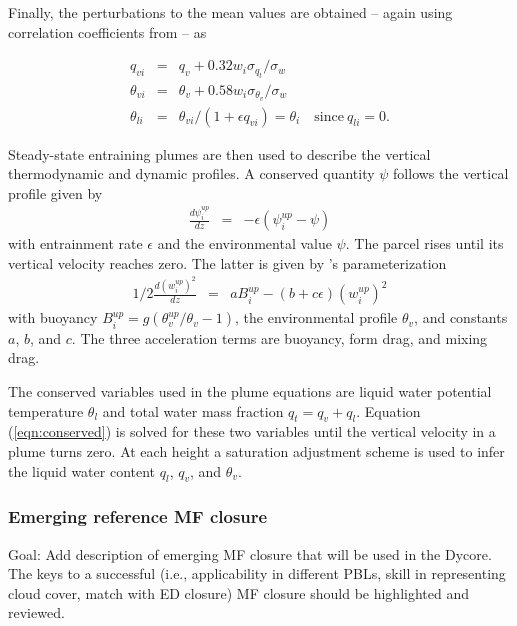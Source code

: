 \documentclass[dvipdfmx,a4paper,10pt]{article}
\begin{document}
Finally, the perturbations to the mean values are obtained -- again using correlation coefficients from \cite{cheinet03a} -- as 

\begin{eqnarray}
 q_{vi}&=&q_{v}+0.32 w_i  \sigma_{q_t}/\sigma_w\\
 \theta_{vi}&=&\theta_{v}+0.58 w_i  \sigma_{\theta_v}/\sigma_w\\
  \theta_{li}&=&\theta_{vi}/(1+\epsilon q_{vi})=\theta_i \quad\mathrm{since}~q_{li}=0.
\end{eqnarray}

Steady-state entraining plumes are then used to describe the vertical thermodynamic and dynamic profiles. A conserved quantity $\psi$ follows the vertical profile given by
\begin{eqnarray}\label{eqn:conserved}
 \frac{d\psi_i^{up} }{d z } &=& - \epsilon(\psi_i^{up} - \psi)
\end{eqnarray}
with entrainment rate $\epsilon$ and the environmental value $\psi$. The parcel rises until its vertical velocity reaches zero. The latter is given by \cite{simpson69a}'s parameterization
\begin{eqnarray}\label{eqn:w}
 1/2\frac{d (w_i^{up})^2 }{d z } &=& aB^{up}_i- (b+c\epsilon)(w_i^{up})^2
\end{eqnarray}
with buoyancy $B_i^{up}=g(\theta_v^{up}/\theta_v-1)$, the environmental profile $\theta_v$, and constants $a$, $b$, and $c$. The three acceleration terms are buoyancy, form drag, and mixing drag. 


The conserved variables used in the plume equations are liquid water potential temperature $\theta_l$ and total water mass fraction $q_t=q_v+q_l$. Equation (\ref{eqn:conserved}) is solved for these two variables until the vertical velocity in a plume turns zero. At each height a saturation adjustment scheme is used to infer the liquid water content $q_l$, $q_v$, and $\theta_v$. 

\subsubsection{Emerging reference MF closure}

{\color{blue} Goal: Add description of emerging MF closure that will be used in the Dycore. The keys to a successful (i.e., applicability in different PBLs, skill in representing cloud cover, match with ED closure) MF closure should be highlighted and reviewed.}
\end{document}
